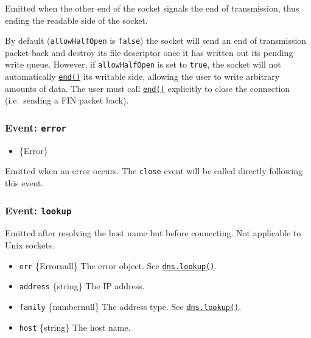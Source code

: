Emitted when the other end of the socket signals the end of
transmission, thus ending the readable side of the socket.

By default (\texttt{allowHalfOpen} is \texttt{false}) the socket will
send an end of transmission packet back and destroy its file descriptor
once it has written out its pending write queue. However, if
\texttt{allowHalfOpen} is set to \texttt{true}, the socket will not
automatically \hyperref[socketenddata-encoding-callback]{\texttt{end()}}
its writable side, allowing the user to write arbitrary amounts of data.
The user must call
\hyperref[socketenddata-encoding-callback]{\texttt{end()}} explicitly to
close the connection (i.e.~sending a FIN packet back).

\subsubsection{\texorpdfstring{Event:
\texttt{\textquotesingle{}error\textquotesingle{}}}{Event: \textquotesingle error\textquotesingle{}}}\label{event-error-1}

\begin{itemize}
\tightlist
\item
  \{Error\}
\end{itemize}

Emitted when an error occurs. The
\texttt{\textquotesingle{}close\textquotesingle{}} event will be called
directly following this event.

\subsubsection{\texorpdfstring{Event:
\texttt{\textquotesingle{}lookup\textquotesingle{}}}{Event: \textquotesingle lookup\textquotesingle{}}}\label{event-lookup}

Emitted after resolving the host name but before connecting. Not
applicable to Unix sockets.

\begin{itemize}
\tightlist
\item
  \texttt{err} \{Error\textbar null\} The error object. See
  \href{dns.md\#dnslookuphostname-options-callback}{\texttt{dns.lookup()}}.
\item
  \texttt{address} \{string\} The IP address.
\item
  \texttt{family} \{number\textbar null\} The address type. See
  \href{dns.md\#dnslookuphostname-options-callback}{\texttt{dns.lookup()}}.
\item
  \texttt{host} \{string\} The host name.
\end{itemize}

